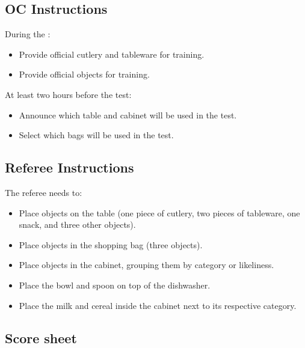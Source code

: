 \subsection*{OC Instructions}

During the \SetupDays:
\begin{itemize}
	\item Provide official cutlery and tableware for training.
	\item Provide official objects for training.
\end{itemize}
At least two hours before the test:
\begin{itemize}
	\item Announce which table and cabinet will be used in the test.
	\item Select which bags will be used in the test.
\end{itemize}


\subsection*{Referee Instructions}

The referee needs to:
\begin{itemize}
	\item Place objects on the table (one piece of cutlery, two pieces of tableware, one snack, and three other objects).
	\item Place objects in the shopping bag (three objects).
	\item Place objects in the cabinet, grouping them by category or likeliness.
	\item Place the bowl and spoon on top of the dishwasher.
	\item Place the milk and cereal inside the cabinet next to its respective category.
\end{itemize}

\subsection*{Score sheet}


